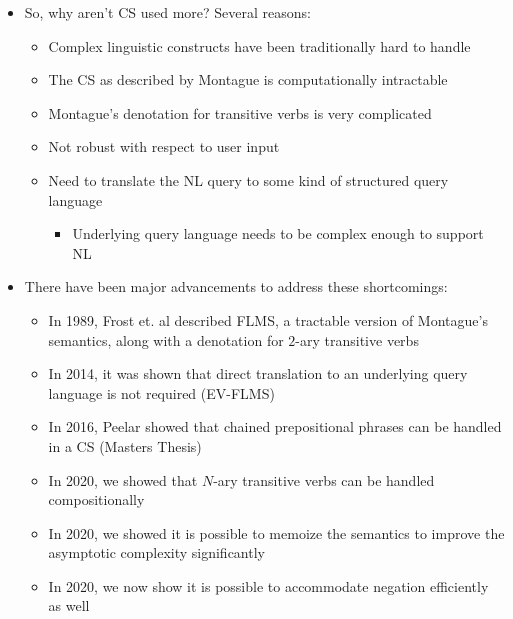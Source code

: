 \documentclass[logoontitle,tabu,supertabular,aspectratio=43]{preney-uwindsor-beamer}
\begin{document}
	\begin{frame}{\insertsection}
		\begin{itemize}
			\item So, why aren't CS used more?  Several reasons:
			\begin{itemize}
				\item Complex linguistic constructs have been traditionally hard to handle
				\item The CS as described by Montague is computationally intractable
				\item Montague's denotation for transitive verbs is very complicated
				\item Not robust with respect to user input
				\item Need to translate the NL query to some kind of structured query language \cite{hoffart2013yago2}
				\begin{itemize}
					\item Underlying query language needs to be complex enough to support NL
				\end{itemize}
			\end{itemize}
		\end{itemize}
	\end{frame}

	\begin{frame}{\insertsection}
		\begin{itemize}
			\item There have been major advancements to address these shortcomings:
			\begin{itemize}
			\item In 1989, Frost et. al described FLMS, a tractable version of Montague's semantics, along with a denotation for $2$-ary transitive verbs \cite{frost1989constructing}
			\item In 2014, it was shown that direct translation to an underlying query language is not required (EV-FLMS) \cite{frost2014denotational}
			\item In 2016, Peelar showed that chained prepositional phrases can be handled in a CS (Masters Thesis) \cite{peelar2016accommodating}
			\item In 2020, we showed that $N$-ary transitive verbs can be handled compositionally \cite{peelar2020compositional}
            \item In 2020, we showed it is possible to memoize the semantics to improve the asymptotic complexity significantly \cite{peelar2020webistjournal}
            \item In 2020, we now show it is possible to accommodate negation efficiently as well
			\end{itemize}
		\end{itemize}
	\end{frame}
\end{document}
